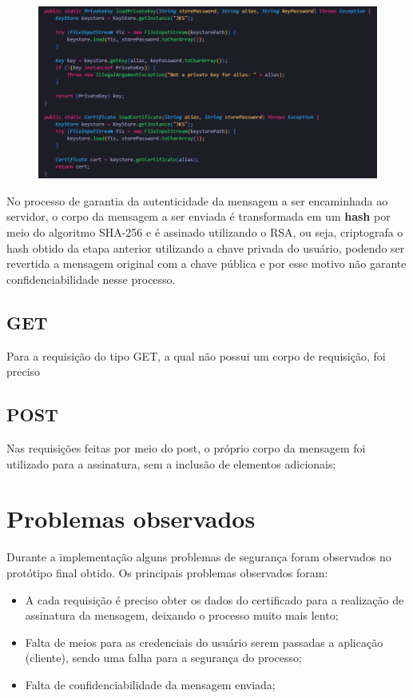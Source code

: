 \documentclass[12pt]{article}
\begin{document}
\begin{figure}[h]
    \centering
    \includegraphics[width = 0.8\linewidth]{Imagens/CryptoUtils.png}  
    \label{fig:CryptoUtils}
\end{figure}

No processo de garantia da autenticidade da mensagem a ser encaminhada ao servidor, o corpo da mensagem a ser enviada é transformada em um \textbf{hash} por meio do algoritmo SHA-256 e é assinado utilizando o RSA, ou seja, criptografa o hash obtido da etapa anterior utilizando a chave privada do usuário, podendo ser revertida a mensagem original com a chave pública e por esse motivo não garante confidenciabilidade nesse processo. 


\subsection{GET}
Para a requisição do tipo GET, a qual não possui um corpo de requisição, foi preciso

\subsection{POST}
Nas requisições feitas por meio do post, o próprio corpo da mensagem foi utilizado para a assinatura, sem a inclusão de elementos adicionais;


\section{Problemas observados}
Durante a implementação alguns problemas de segurança foram observados no protótipo final obtido. Os principais problemas observados foram:
\begin{itemize}
  \item A cada requisição é preciso obter os dados do certificado para a realização de assinatura da mensagem, deixando o processo muito mais lento;
  \item Falta de meios para as credenciais do usuário serem passadas a aplicação (cliente), sendo uma falha para a segurança do processo;
  \item Falta de confidenciabilidade da mensagem enviada;
\end{itemize}
\end{document}
